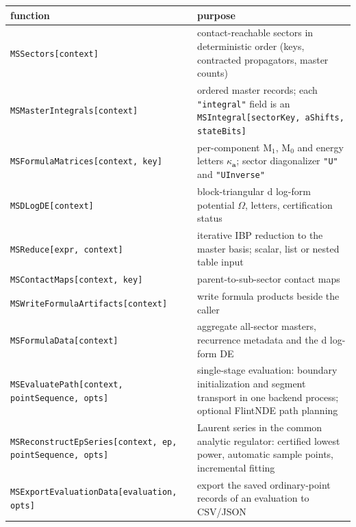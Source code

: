 \documentclass[11pt,a4paper]{article}
\begin{document}
\begin{center}
\begin{tabular}{@{}p{7.1cm}p{7.3cm}@{}}
\toprule
function & purpose\\
\midrule
\texttt{MSSectors[context]} & contact-reachable sectors in deterministic order (keys, contracted
propagators, master counts)\\
\texttt{MSMasterIntegrals[context]} & ordered master records; each \texttt{"integral"} field is an
\texttt{MSIntegral[sectorKey, aShifts, stateBits]}\\
\texttt{MSFormulaMatrices[context, key]} & per-component $\text{M}_1$, $\text{M}_0$ and energy letters $\kappa_{\bm a}$;
sector diagonalizer \texttt{"U"} and \texttt{"UInverse"}\\
\texttt{MSDLogDE[context]} & block-triangular d log-form potential $\Omega$, letters, certification
status\\
\texttt{MSReduce[expr, context]} & iterative IBP reduction to the master basis; scalar, list or nested table input\\
\texttt{MSContactMaps[context, key]} & parent-to-sub-sector contact maps\\
\texttt{MSWriteFormulaArtifacts[context]} & write formula products beside the caller\\
\texttt{MSFormulaData[context]} & aggregate all-sector masters, recurrence metadata and the d log-form DE\\
\texttt{MSEvaluatePath[context, pointSequence, opts]} & single-stage evaluation: boundary initialization and segment transport in one backend process; optional FlintNDE path planning\\
\texttt{MSReconstructEpSeries[context, ep, pointSequence, opts]} & Laurent series in the common analytic regulator: certified lowest power, automatic sample points, incremental fitting\\
\texttt{MSExportEvaluationData[evaluation, opts]} & export the saved ordinary-point records of an evaluation to CSV/JSON\\
\bottomrule
\end{tabular}
\end{center}
\end{document}
